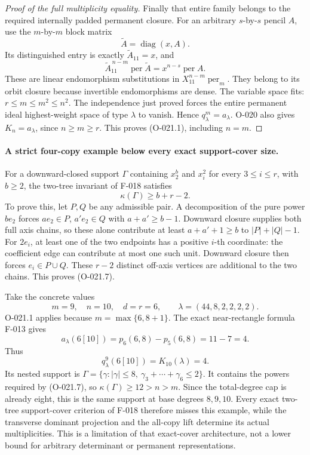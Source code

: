 \begin{proof}[Proof of the full multiplicity equality]
Finally that entire family belongs to the required
internally padded permanent closure. For an arbitrary
$s$-by-$s$ pencil $A$, use the $m$-by-$m$ block matrix
\[
                         \widetilde A=\operatorname{diag}(x,A).
\]
Its distinguished entry is exactly $\widetilde A_{11}=x$,
and
\[
 \widetilde A_{11}^{\,n-m}\operatorname{per}\widetilde A
                      =x^{n-s}\operatorname{per}A.
                                                               \tag{O-021.6}
\]
These are linear endomorphism substitutions in
$X_{11}^{n-m}\operatorname{per}_m$. They belong to its
orbit closure because invertible endomorphisms are dense.
The variable space fits: $r\leq m\leq m^2\leq n^2$.
The independence just proved forces the entire permanent
ideal highest-weight space of type $\lambda$ to vanish.
Hence $q^m_\lambda=a_\lambda$.
O-020 also gives $K_n=a_\lambda$, since $n\geq m\geq r$.
This proves (O-021.1), including $n=m$.
\end{proof}

\paragraph{A strict four-copy example below every exact support-cover size.}
For a downward-closed support $\Gamma$ containing
$x_2^b$ and $x_i^2$ for every $3\leq i\leq r$, with
$b\geq2$, the two-tree invariant of F-018 satisfies
\[
                            \kappa(\Gamma)\geq b+r-2.
                                                               \tag{O-021.7}
\]
To prove this, let $P,Q$ be any admissible pair.
A decomposition of the pure power $b e_2$ forces
$a e_2\in P$, $a'e_2\in Q$ with $a+a'\geq b-1$.
Downward closure supplies both full axis chains, so these
alone contribute at least $a+a'+1\geq b$ to
$|P|+|Q|-1$. For $2e_i$, at least one of the two
endpoints has a positive $i$-th coordinate: the coefficient
edge can contribute at most one such unit. Downward closure
then forces $e_i\in P\cup Q$. These $r-2$ distinct
off-axis vertices are additional to the two chains.
This proves (O-021.7).

Take the concrete values
\[
       m=9,\quad n=10,\quad d=r=6,\qquad
                    \lambda=(44,8,2,2,2,2).
                                                               \tag{O-021.8}
\]
O-021.1 applies because $m=\max\{6,8+1\}$.
The exact near-rectangle formula F-013 gives
\[
      a_\lambda(6[10])=p_6(6,8)-p_5(6,8)=11-7=4.
\]
Thus
\[
                        q^9_\lambda(6[10])
                                =K_{10}(\lambda)=4.   \tag{O-021.9}
\]
Its nested support is
$\Gamma=\{\gamma:|\gamma|\leq8,\
                  \gamma_3+\cdots+\gamma_6\leq2\}$.
It contains the powers required by (O-021.7), so
$\kappa(\Gamma)\geq12>n>m$. Since the total-degree
cap is already eight, this is the same support at base
degrees $8,9,10$. Every exact two-tree support-cover
criterion of F-018 therefore misses this example, while
the transverse dominant projection and the all-copy lift
determine its actual multiplicities. This is a limitation
of that exact-cover architecture, not a lower bound for
arbitrary determinant or permanent representations.

